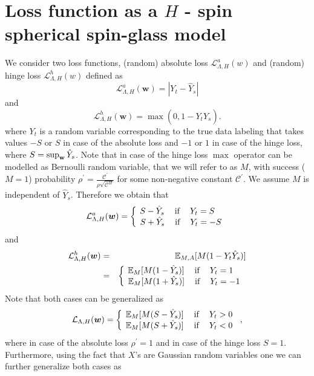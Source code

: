 \documentclass[twoside]{article}
\begin{document}
\section{Loss function as a $H$ - spin spherical spin-glass model}

We consider two loss functions, (random) absolute loss $\mathcal{L}^a_{\Lambda,H}(w)$ and (random) hinge loss $\mathcal{L}^h_{\Lambda,H}(w)$ defined as
\[\mathcal{L}^a_{\Lambda,H}({\bm w}) = |Y_t - \hat{Y}_s|
\]
and
\[\mathcal{L}^h_{\Lambda,H}({\bm w}) = \max(0,1-Y_t\hat{Y}_s).
\]
where $Y_t$ is a random variable corresponding to the true data labeling that takes values $-S$ or $S$ in case of the absolute loss and $-1$ or $1$ in case of the hinge loss, where $S = \sup_{\bf{w}}{\hat{Y}_s}$. Note that in case of the hinge loss $\max$ operator can be modelled as Bernoulli random variable, that we will refer to as $M$, with success ($M = 1$) probability $\rho^{'} = \frac{\mathcal{C}^{'}}{\rho\sqrt{\mathcal{C}^H}}$ for some non-negative constant $\mathcal{C}^{'}$. We assume $M$ is independent of $\hat{Y}_s$. Therefore we obtain that
\[\mathcal{L}^a_{\Lambda,H}({\bm w}) = \left \{
  \begin{tabular}{c}
  $\!\!\!\!\!\!S - \hat{Y}_s$ $\:\:\:\:$if$\:\:\:\:$ $Y_t = S$ \\
  $\!S + \hat{Y}_s$ $\:\:\:\:$if$\:\:\:\:$ $Y_t = -S$ \\
  \end{tabular}
\right.
\]
and
\begin{eqnarray*}
\mathcal{L}^h_{\Lambda,H}({\bm w}) &=& \mathbb{E}_{M,A}[M(
1-Y_t\hat{Y}_s)]\\&=& \left \{
  \begin{tabular}{c}
  $\!\!\!\!\!\!\mathbb{E}_{M}[M(1 - \hat{Y}_s)]$ $\:\:\:\:$if$\:\:\:\:$ $Y_t = 1$ \\
  $\!\mathbb{E}_{M}[M(1 + \hat{Y}_s)]$ $\:\:\:\:$if$\:\:\:\:$ $Y_t = -1$ \\
  \end{tabular}
\right.
\end{eqnarray*}
Note that both cases can be generalized as
\[\mathcal{L}_{\Lambda,H}({\bm w}) = \left \{
  \begin{tabular}{c}
  $\!\mathbb{E}_{M}[M(S - \hat{Y}_s)]$ $\:\:\:\:$if$\:\:\:\:$ $Y_t  > 0$ \\
  $\!\mathbb{E}_{M}[M(S + \hat{Y}_s)]$ $\:\:\:\:$if$\:\:\:\:$ $Y_t < 0$ \\
  \end{tabular}
\right.,
\]
where in case of the absolute loss $\rho^{'} = 1$ and in case of the hinge loss $S = 1$. Furthermore, using the fact that $X$'s are Gaussian random variables one we can further generalize both cases as
\end{document}
